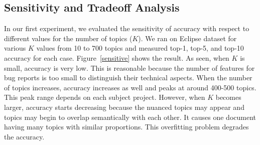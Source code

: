 





\subsection{Sensitivity and Tradeoff Analysis}


In our first experiment, we evaluated the sensitivity of accuracy with
respect to different values for the number of topics ($K$). 
We ran {\model} on Eclipse dataset for various $K$ values from 10 to
700 topics and measured top-1, top-5, and top-10 accuracy for each
case. Figure~\ref{sensitive} shows the result. As seen, when $K$ is
small, accuracy is very low. This is reasonable because the number of
features for bug reports is too small to distinguish their technical
aspects. When the number of topics increases, accuracy increases as
well and peaks at around 400-500 topics. This peak range depends on
each subject project. However, when $K$ becomes larger, accuracy
starts decreasing because the nuanced topics may appear and topics may
begin to overlap semantically with each other. It causes one
document having many topics with similar proportions. This overfitting
problem degrades the accuracy.


